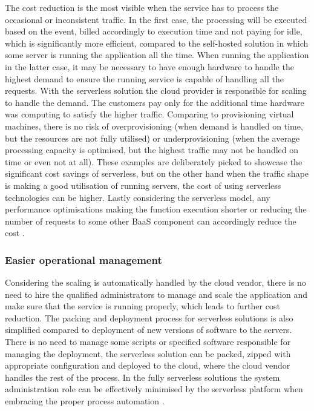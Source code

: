 The cost reduction is the most visible when the service has to process the occasional or inconsistent traffic. In the first case, the processing will be executed based on the event, billed accordingly to execution time and not paying for idle, which is significantly more efficient, compared to the self-hosted solution in which some server is running the application all the time. When running the application in the latter case, it may be necessary to have enough hardware to handle the highest demand to ensure the running service is capable of handling all the requests. With the serverless solution the cloud provider is responsible for scaling to handle the demand. The customers pay only for the additional time hardware was computing to satisfy the higher traffic. Comparing to provisioning virtual machines, there is no risk of overprovisioning (when demand is handled on time, but the resources are not fully utilised) or underprovisioning (when the average processing capacity is optimised, but the highest traffic may not be handled on time or even not at all). These examples are deliberately picked to showcase the significant cost savings of serverless, but on the other hand when the traffic shape is making a good utilisation of running servers, the cost of using serverless technologies can be higher. Lastly considering the serverless model, any performance optimisations making the function execution shorter or reducing the number of requests to some other BaaS component can accordingly reduce the cost \cite{MartinFowlerServerless}.

\subsubsection*{Easier operational management}

Considering the scaling is automatically handled by the cloud vendor, there is no need to hire the qualified administrators to manage and scale the application and make sure that the service is running properly, which leads to further cost reduction. The packing and deployment process for serverless solutions is also simplified compared to deployment of new versions of software to the servers. There is no need to manage some scripts or specified software responsible for managing the deployment, the serverless solution can be packed, zipped with appropriate configuration and deployed to the cloud, where the cloud vendor handles the rest of the process. In the fully serverless solutions the system administration role can be effectively minimised by the serverless platform when embracing the proper process automation \cite{MartinFowlerServerless}.

